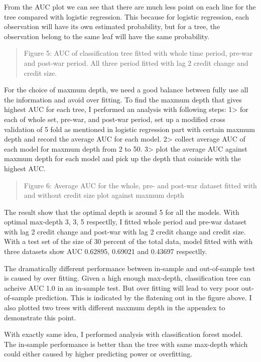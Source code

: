 \documentclass{article}
\begin{document}
From the AUC plot we can see that there are much less point on each line
for the tree compared with logistic regression. This because for
logistic regression, each observation will have its own estimated
probability, but for a tree, the observation belong to the same leaf
will have the same probability.

\begin{quote}
Figure 5: AUC of classification tree fitted with whole time period,
pre-war and post-war period. All three period fitted with lag 2 credit
change and credit size.
\end{quote}

For the choice of maxmum depth, we need a good balance between fully use
all the information and avoid over fitting. To find the maxmum depth
that gives highest AUC for each tree, I performed an analysis with
following steps: 1\textgreater{} for each of whole set, pre-war, and
post-war period, set up a modified cross validation of 5 fold as
mentioned in logistic regression part with certain maxmum depth and
record the average AUC for each model. 2\textgreater{} collect average
AUC of each model for maxmum depth from 2 to 50. 3\textgreater{} plot
the average AUC against maxmum depth for each model and pick up the
depth that coincide with the highest AUC.

\begin{quote}
Figure 6: Average AUC for the whole, pre- and post-war dataset fitted
with and without credit size plot against maxmum depth
\end{quote}

The result show that the optimal depth is around 5 for all the models.
With optimal max-depth 3, 3, 5 respectlly, I fitted whole period and
pre-war dataset with lag 2 credit change and post-war with lag 2 credit
change and credit size. With a test set of the size of 30 percent of the
total data, model fitted with with three datasets show AUC 0.62895,
0.69021 and 0.43697 respectlly.

The dramatically different performance between in-sample and
out-of-sample test is caused by over fitting. Given a high enough
max-depth, classification tree can acheive AUC 1.0 in an in-sample test.
But over fitting will lead to very poor out-of-sample prediction. This
is indicated by the flatening out in the figure above. I also plotted
two trees with different maxmum depth in the appendex to demonstrate
this point.

With exactly same idea, I performed analysis with classification forest
model. The in-sample performance is better than the tree with same
max-depth which could either caused by higher predicting power or
overfitting.
\end{document}
